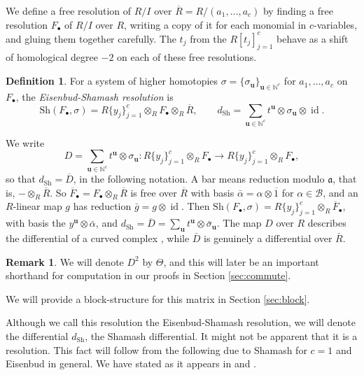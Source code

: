 \documentclass[12pt]{amsart}
\theoremstyle{plain}
\theoremstyle{definition}
\newtheorem{definition}[theorem]{Definition}
\newtheorem{remark}[theorem]{Remark}
\newcommand{\F}{ {F_\bullet} }
\newcommand{\Rbar}{\overline{R}}
\newcommand{\B}{\mathcal{B}}
\newcommand{\id}{\operatorname{id}}
\newcommand{\aaa}{\mathfrak{a}}
\newcommand{\N}{\mathbb{N}}
\newcommand{\Sh}{\mathrm{Sh}}
\begin{document}
We define a free resolution of $R/I$ over $\Rbar = R/(a_1,\dots,a_c)$ by finding a free resolution $\F$ of $R/I$ over $R$, writing a copy of it for each monomial in $c$-variables, and gluing them together carefully. The $t_j$ from the $R[t_j]_{j=1}^c$ behave as a shift of homological degree $-2$ on each of these free resolutions.

\begin{definition}\label{def:shamash}
    \cite[Construction 2.4]{Sobieska} For a system of higher homotopies $\sigma = \{\sigma_{\boldsymbol{u}}\}_{\boldsymbol{u} \in \N^c}$ for $a_1, \dots, a_c$ on $\F$, the \emph{Eisenbud-Shamash resolution} is
    \[
        \Sh(\F, \sigma) = R\{y_j\}_{j=1}^{c} \otimes_R \F \otimes_R \Rbar, \qquad d_{\Sh} = \sum_{\boldsymbol{u} \in \N^c} t^{\boldsymbol{u}} \otimes \sigma_{\boldsymbol{u}} \otimes \id .
    \]
\end{definition}

We write
\[
    D = \sum_{\boldsymbol{u} \in \N^c} t^{\boldsymbol{u}} \otimes \sigma_{\boldsymbol{u}} \colon R\{y_j\}_{j=1}^{c} \otimes_R \F \to R\{y_j\}_{j=1}^{c} \otimes_R \F ,
\]
so that $d_{\Sh} = \overline{D}$, in the following notation. A bar means reduction modulo $\aaa$, that is, $- \otimes_R \Rbar$. So $\overline{F}_\bullet = \F \otimes_R \Rbar$ is free over $\Rbar$ with basis $\bar\alpha = \alpha \otimes \overline{1}$ for $\alpha \in \B$, and an $R$-linear map $g$ has reduction $\bar g = g \otimes \id$. Then $\Sh(\F, \sigma) = R\{y_j\}_{j=1}^{c} \otimes_R \overline{F}_\bullet$, with basis the $y^{\boldsymbol{u}} \otimes \bar\alpha$, and $d_{\Sh} = \overline{D} = \sum_{\boldsymbol{u}} t^{\boldsymbol{u}} \otimes \bar\sigma_{\boldsymbol{u}}$. The map $D$ over $R$ describes the differential of a curved complex \cite[Chapter 3]{LodayVallette}, while $\bar{D}$ is genuinely a differential over $\bar{R}$.

\begin{remark}
    We will denote $D^2$ by $\Theta$, and this will later be an important shorthand for computation in our proofs in Section \ref{sec:commute}.

    We will provide a block-structure for this matrix in Section \ref{sec:block}.
\end{remark}
Although we call this resolution the Eisenbud-Shamash resolution, we will denote the differential $d_{\Sh}$, the Shamash differential. It might not be apparent that it is a resolution. This fact will follow from the following
due to Shamash \cite{Shamash} for $c = 1$ and Eisenbud \cite[Theorem 7.2]{Eisenbud1980} in general. We have stated
as it appears in \cite[Proposition~4.1.4]{EisenbudPeeva} and \cite[Theorem~2.5]{Sobieska}.
\end{document}
